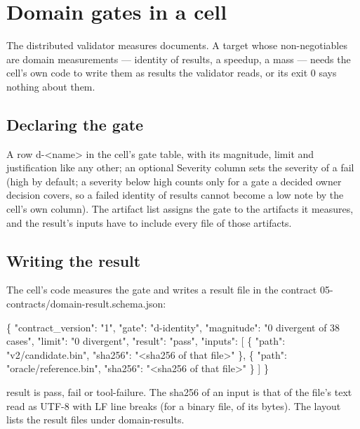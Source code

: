 \documentclass[
  american,
  10pt,
]{report}
\newenvironment{Shaded}{\begin{snugshade}}{\end{snugshade}}
\newcommand{\NormalTok}[1]{#1}
\renewenvironment{Shaded}{%
  \def\FrameCommand{{\color{rulecolor}\vrule width 2pt}\hspace{6pt}\colorbox{shadecolor}}%
  \MakeFramed{\advance\hsize-\width\FrameRestore}\small}%
  {\endMakeFramed}
\renewcommand{\texttt}[1]{{\ttfamily\hyphenchar\font=-1 #1}}
\begin{document}
\chapter{Domain gates in a cell}\label{domain-gates-in-a-cell}

The distributed validator measures documents. A target whose
non-negotiables are domain measurements --- identity of results, a
speedup, a mass --- needs the cell's own code to write them as results
the validator reads, or its exit 0 says nothing about them.

\section{Declaring the gate}\label{declaring-the-gate}

A row \texttt{d-\allowbreak{}<name>} in the cell's gate table, with its
magnitude, limit and justification like any other; an optional Severity
column sets the severity of a \texttt{fail} (high by default; a severity
below high counts only for a gate a decided owner decision covers, so a
failed identity of results cannot become a low note by the cell's own
column). The artifact list assigns the gate to the artifacts it
measures, and the result's inputs have to include every file of those
artifacts.

\section{Writing the result}\label{writing-the-result}

The cell's code measures the gate and writes a result file in the
contract
\texttt{05-\allowbreak{}contracts/\allowbreak{}domain-\allowbreak{}result.\allowbreak{}schema.\allowbreak{}json}:

\begin{Shaded}
\begin{Highlighting}[]
\NormalTok{\{}
\NormalTok{  "contract\_version": "1",}
\NormalTok{  "gate": "d{-}identity",}
\NormalTok{  "magnitude": "0 divergent of 38 cases",}
\NormalTok{  "limit": "0 divergent",}
\NormalTok{  "result": "pass",}
\NormalTok{  "inputs": [ \{ "path": "v2/candidate.bin", "sha256": "\textless{}sha256 of that file\textgreater{}" \},}
\NormalTok{              \{ "path": "oracle/reference.bin", "sha256": "\textless{}sha256 of that file\textgreater{}" \} ]}
\NormalTok{\}}
\end{Highlighting}
\end{Shaded}

\texttt{result} is \texttt{pass}, \texttt{fail} or
\texttt{tool-\allowbreak{}failure}. The sha256 of an input is that of
the file's text read as UTF-8 with LF line breaks (for a binary file, of
its bytes). The layout lists the result files under
\texttt{domain-\allowbreak{}results}.
\end{document}
